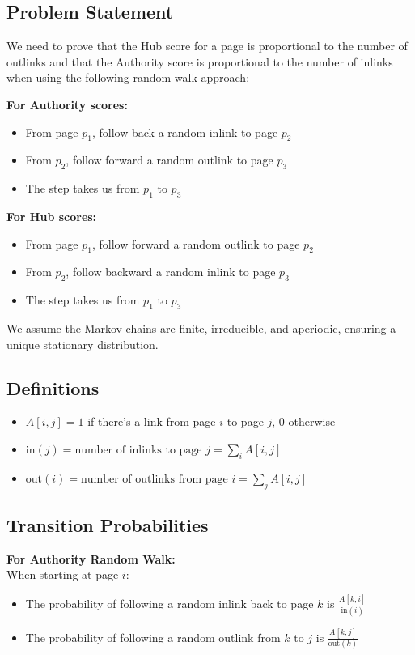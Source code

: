 \documentclass{article}
\begin{document}
\subsection{Problem Statement}
We need to prove that the Hub score for a page is proportional to the number of outlinks and that the Authority score is proportional to the number of inlinks when using the following random walk approach:


\textbf{For Authority scores:}
\begin{itemize}
    \item From page $p_1$, follow back a random inlink to page $p_2$
    \item From $p_2$, follow forward a random outlink to page $p_3$
    \item The step takes us from $p_1$ to $p_3$
\end{itemize}

\textbf{For Hub scores:}
\begin{itemize}
    \item From page $p_1$, follow forward a random outlink to page $p_2$
    \item From $p_2$, follow backward a random inlink to page $p_3$
    \item The step takes us from $p_1$ to $p_3$
\end{itemize}

We assume the Markov chains are finite, irreducible, and aperiodic, ensuring a unique stationary distribution.

\subsection{Definitions}
\begin{itemize}
    \item $A[i,j] = 1$ if there's a link from page $i$ to page $j$, 0 otherwise
    \item $\text{in}(j) = \text{number of inlinks to page } j = \sum_i A[i,j]$
    \item $\text{out}(i) = \text{number of outlinks from page } i = \sum_j A[i,j]$
\end{itemize}

\subsection{Transition Probabilities}

\textbf{For Authority Random Walk:}\\
When starting at page $i$:
\begin{itemize}
    \item The probability of following a random inlink back to page $k$ is $\frac{A[k,i]}{\text{in}(i)}$
    \item The probability of following a random outlink from $k$ to $j$ is $\frac{A[k,j]}{\text{out}(k)}$
\end{itemize}
\end{document}
